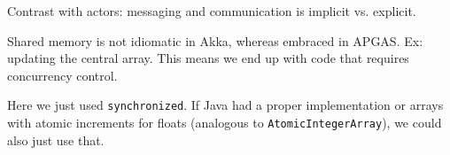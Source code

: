 Contrast with actors: messaging and communication is implicit vs. explicit.

Shared memory is not idiomatic in Akka, whereas embraced in APGAS. Ex: updating
the central array. This means we end up with code that requires concurrency
control.

Here we just used \lstinline{synchronized}. If Java had a proper
implementation or arrays with atomic increments for floats (analogous to
\lstinline{AtomicIntegerArray}), we could also just use that.

